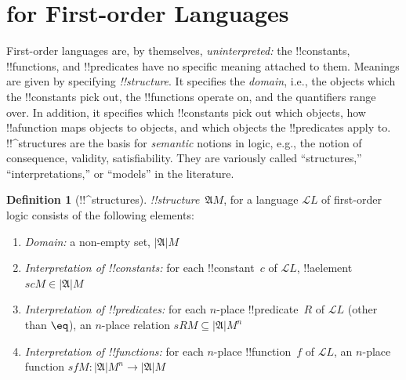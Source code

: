 \documentclass[10pt,a4paper]{article}
\theoremstyle{plain}
\theoremstyle{definition}
\newtheorem{defn}[thm]{Definition}
\theoremstyle{remark}
\newenvironment{explain}{}{}
\newcommand*{\olfileid}[3]{}
\newcommand*{\olsection}[1]{\section*{#1}}
\newcommand*{\olchapter}[3]{}
\newcommand*{\olimport}[1]{}
\providecommand{\Struct}{\ensuremath{\mathfrak{A}}}
\providecommand{\Domain}{\ensuremath{|\mathfrak{A}|}}
\providecommand{\Assign}{\ensuremath{s}}
\providecommand{\Lang}{\ensuremath{\mathcal{L}}}
\begin{document}



\olchapter{fol}{sem}{Semantics of First-Order Logic}

\olimport{intro-semantics}

\olimport{structures}

\olimport{covered-structures}

\olimport{satisfaction}

\olimport{assignments}

\olimport{extensionality}

\olimport{semantic-notions}

\OLEndChapterHook





\olfileid{fol}{syn}{str}

\olsection{ for First-order Languages}

\begin{explain}
First-order languages are, by themselves, \emph{uninterpreted:} the
!!{constant}s, !!{function}s, and !!{predicate}s have no specific
meaning attached to them.  Meanings are given by specifying
 \emph{!!{structure}}. It specifies the
\emph{domain}, i.e., the objects which the !!{constant}s pick out, the
!!{function}s operate on, and the quantifiers range over. In addition,
it specifies which !!{constant}s pick out which objects, how
!!a{function} maps objects to objects, and which objects the
!!{predicate}s apply to.  !!^{structure}s are the basis for
\emph{semantic} notions in logic, e.g., the notion of consequence,
validity, satisfiability. They are variously called ``structures,''
``interpretations,'' or ``models'' in the literature.
\end{explain}

\begin{defn}[!!^{structure}s]
 \emph{!!{structure}}~$\Struct M$, for a language
$\Lang{L}$ of first-order logic consists of the following elements:
\begin{enumerate}
\item \emph{Domain:} a non-empty set, $\Domain M$
\item \emph{Interpretation of !!{constant}s:} for each !!{constant}~$c$ of
  $\Lang{L}$, !!a{element} $\Assign{c}{M} \in \Domain M$
\item \emph{Interpretation of !!{predicate}s:} for each $n$-place
  !!{predicate}~$R$ of $\Lang{L}$ (other than $\eq$), an $n$-place
  relation $\Assign{R}{M} \subseteq \Domain{M}^n$
\item \emph{Interpretation of !!{function}s:} for each $n$-place
  !!{function}~$f$ of $\Lang{L}$, an $n$-place function $\Assign{f}{M}
  \colon \Domain{M}^n \to \Domain{M}$
\end{enumerate}
\end{defn}
\end{document}
